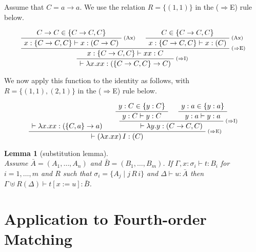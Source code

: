 \documentclass[10pt,a4paper]{article}
\theoremstyle{plain}%
\newtheorem{lemma}[theorem]{Lemma}
\begin{document}
\bigskip

Assume that $C = a\to a$. We use the relation $R = \{(1,1)\}$ in the
($\Rightarrow$E) rule below.

\[
  \begin{gathered}
    \RightLabel{\scriptsize (Ax)}
    \AxiomC{$C\to C \in \{C\to C, C\}$}
    \UnaryInfC{$x:\{C\to C, C\} \vdash x : (C\to C)$}
    \RightLabel{\scriptsize (Ax)}
    \AxiomC{$C \in \{C\to C, C\}$}
    \UnaryInfC{$x:\{C\to C, C\} \vdash x : (C)$}
    \RightLabel{\scriptsize ($\Rightarrow$E)}
    \BinaryInfC{$x : \{C\to C, C\} \vdash xx : C$}
    \RightLabel{\scriptsize ($\Rightarrow$I)}
    \UnaryInfC{$\vdash \lambda x.xx : (\{C\to C, C\} \to C)$}
    \DisplayProof
\end{gathered}
\]

We now apply this function to the identity as follows, with $R =
\{(1,1),(2,1)\}$
in the ($\Rightarrow$E) rule below.

\[
\AxiomC{$\vdash \lambda x.xx : (\{C, a\} \to a)$}
\AxiomC{$y:C\in\{y:C\}$}
\UnaryInfC{$y:C\vdash y : C$}
\AxiomC{$y:a\in\{y:a\}$}
\UnaryInfC{$y:a\vdash y : a$}
\RightLabel{\scriptsize ($\Rightarrow$I)}
\BinaryInfC{$ \vdash \lambda y.y : (C\to C,C)$}
\RightLabel{\scriptsize ($\Rightarrow$E)}
\BinaryInfC{$\vdash (\lambda x.xx)\,I:(C)$}
\DisplayProof
\]

\begin{lemma}[substitution lemma]
  ~\\
  Assume $\bar{A} = (A_1,\ldots,A_n)$ and $\bar{B} = (B_1,\ldots,B_m)$.
  If $\Gamma, x:\sigma_i\vdash t : B_i$ %
  for $i=1,\ldots,m$ and $R$ such that $\sigma_i = \{A_j \mid j\, R\, i\}$
  and $\Delta\vdash u : \bar{A}$ %
  then $\Gamma\uplus R(\Delta) \vdash t[x:=u] : \bar{B}$.
  
\end{lemma}


\newpage

\section{Application to Fourth-order Matching}


\newpage
\end{document}
